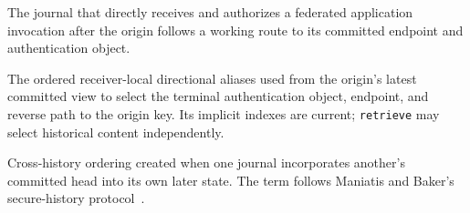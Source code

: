 \begin{description}[style=nextline]
  \item[Terminal journal]
    The journal that directly receives and authorizes a federated application invocation after the origin follows a working route to its committed endpoint and authentication object.

  \item[Working route]
    The ordered receiver-local directional aliases used from the origin's latest committed view to select the terminal authentication object, endpoint, and reverse path to the origin key. Its implicit indexes are current; \texttt{retrieve} may select historical content independently.

  \item[Entanglement]
    Cross-history ordering created when one journal incorporates another's committed head into its own later state. The term follows Maniatis and Baker's secure-history protocol~\cite{Maniatis2002timeline}.
\end{description}
